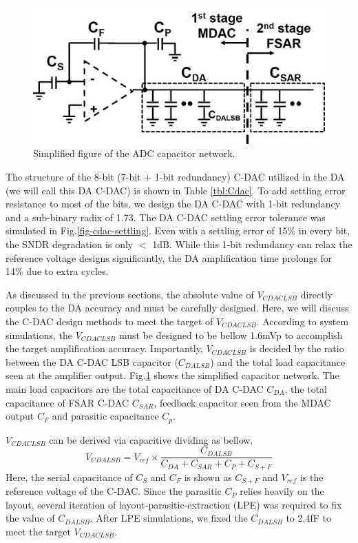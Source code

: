 \begin{figure}[!]
\centering
  \includegraphics[width=1\textwidth]{figure/chap2/capacitor-network.jpg}
  \caption{Simplified figure of the ADC capacitor network.}
  \label{fig-capacitor-network}
\end{figure}

The structure of the 8-bit (7-bit + 1-bit redundancy) C-DAC utilized in the DA (we will call this DA C-DAC) is shown in Table \ref{tbl:Cdac}. To add settling error resistance to most of the bits, we design the DA C-DAC with 1-bit redundancy and a sub-binary radix of 1.73. The DA C-DAC settling error tolerance was simulated in Fig.\ref{fig-cdac-settling}. Even with a settling error of 15\% in every bit, the SNDR degradation is only $<$ 1dB. While this 1-bit redundancy can relax the reference voltage designs significantly, the DA amplification time prolongs for 14\% due to extra cycles.

As discussed in the previous sections, the absolute value of $V_{CDACLSB}$ directly couples to the DA accuracy and must be carefully designed. Here,  we will discuss the C-DAC design methods to meet the target of $V_{CDACLSB}$. According to system simulations, the $V_{CDACLSB}$ must be designed to be bellow 1.6mVp to accomplish the target amplification accuracy. Importantly, $V_{CDACLSB}$ is decided by the ratio between the DA C-DAC LSB capacitor ($C_{DALSB}$) and the total load capacitance seen at the amplifier output. Fig.\ref{fig-capacitor-network} shows the simplified capacitor network. The main load capacitors are the total capacitance of DA C-DAC $C_{DA}$, the total capacitance of FSAR C-DAC $C_{SAR}$, feedback capacitor seen from the MDAC output $C_F$ and parasitic capacitance $C_p$. 

$V_{CDACLSB}$ can be derived via capacitive dividing as bellow.
 \begin{equation}
    V_{CDALSB} =V_{ref} \times \frac{C_{DALSB}}{C_{DA}+C_{SAR}+C_P+C_{S+F}}  
 \end{equation}
Here, the serial capacitance of $C_S$ and $C_F$ is shown as $C_{S+F}$ and $V_{ref}$ is the reference voltage of the C-DAC. Since the parasitic $C_P$ relies heavily on the layout, several iteration of layout-parasitic-extraction (LPE) was  required to fix the value of $C_{DALSB}$. After LPE simulations, we fixed the $C_{DALSB}$ to 2.4fF to meet the target $V_{CDACLSB}$.


